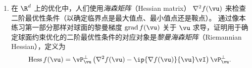 \documentclass[../../book-main_zh.tex]{subfiles}
\begin{document}
\begin{exercise}
\begin{enumerate}
            \begin{equation*}
                \mathrm{grad}\, f(\vu) = \mathbf{0}.
            \end{equation*}
            几何上，这表示 $f$ 在 $\vu$ 处的欧几里得梯度必须正交于球面在 $\vu$ 处的切空间。
            现在假设 $\vv \in \R^d$ 非零。使用一阶最优性条件证明
            \begin{equation*}
                \mathrm{proj}_{\bS^{d-1}}(\vv) \doteq
                \min_{\norm{\vu}_2^2 = 1}\, \norm{\vu - \vv}_2
                =
                \frac{\vv}{\norm{\vv}_2}，
            \end{equation*}
        \item 在 $\R^d$ 上的优化中，人们使用\textit{海森矩阵}（Hessian matrix）
            $\nabla^2 f(\vu)$ 来检查二阶最优性条件（以确定临界点是最大值点、最小值点还是鞍点）。
            通过像本练习第一部分那样对球面的黎曼梯度
            $\mathrm{grad}\, f(\vu)$ 关于 $\vu$
            求导，证明用于确定球面约束优化的二阶最优性条件的对应对象是\textit{黎曼海森矩阵}（Riemannian Hessian），定义为
            \begin{equation}\label{eq:exercise-riemann-hess-sphere}
                \mathrm{Hess}\, f(\vu) = \vP_{\vu}^\perp \left(
                    \nabla^2 f(\vu) - \ip{\nabla f(\vu)}{\vu} \vI
                \right) \vP_{\vu}^\perp.
            \end{equation}
    \end{enumerate}
\end{exercise}
\end{document}
